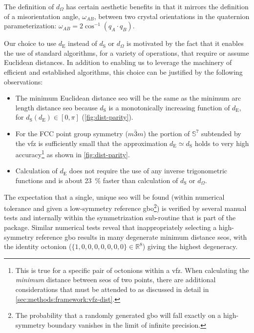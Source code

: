 \documentclass[final,twocolumn,12pt]{elsarticle}
\begin{document}
The definition of $d_\Omega$ has certain aesthetic benefits in that it mirrors the definition of a misorientation angle, $\omega_{AB}$, between two crystal orientations in the quaternion parameterization: $\omega_{AB} = 2 \cos^{-1}{\left(q_A \cdot q_B\right)}$.

Our choice to use $d_{\text{E}}$ instead of $d_{\text{S}}$ or $d_\Omega$ is motivated by the fact that it enables the use of standard algorithms, for a variety of operations, that require or assume Euclidean distances. In addition to enabling us to leverage the machinery of efficient and established algorithms, this choice can be justified by the following observations:
\begin{itemize}
    \item The minimum Euclidean distance \gls{seo} will be the same as the minimum arc length distance \gls{seo} because $d_{\text{S}}$ is a monotonically increasing function of $d_{\text{E}}$, for $d_{\text{S}}\!\left(d_{\text{E}}\right)\in[0,\pi]$ (\cref{fig:dist-parity}). 
    \item For the FCC point group symmetry ($m\bar{3}m$) the portion of $\mathbb{S}^7$ subtended by the \gls{vfz} is sufficiently small that the approximation $d_{\text{E}} \simeq d_{\text{S}}$ holds to very high accuracy\footnote{This is true for a specific pair of octonions within a \gls{vfz}. When calculating the \emph{minimum} distance between \glspl{seo} of two points, there are additional considerations that must be attended to as discussed in detail in \cref{sec:methods:framework:vfz-dist}.} as shown in \cref{fig:dist-parity}. 
    \item Calculation of $d_{\text{E}}$ does not require the use of any inverse trigonometric functions and is about \SI{23}{\percent} faster than calculation of $d_{\text{S}}$ or $d_\Omega$.
\end{itemize}
The expectation that a single, unique \gls{seo} will be found (within numerical tolerance and given a low-symmetry reference \gls{gbo}\footnote{The probability that a randomly generated \gls{gbo} will fall exactly on a high-symmetry boundary vanishes in the limit of infinite precision. }) is verified by several manual tests and internally within the symmetrization sub-routine  \cite{bairdFiveDegreeofFreedom5DOF2020} that is part of the  package. Similar numerical tests reveal that inappropriately selecting a high-symmetry reference \gls{gbo} results in many degenerate minimum distance \glspl{seo}, with the identity octonion ($\{1,0,0,0,0,0,0,0\}\in\mathbb{R}^8$) \cite{francisGeodesicOctonionMetric2019} giving the highest degeneracy.
\end{document}
